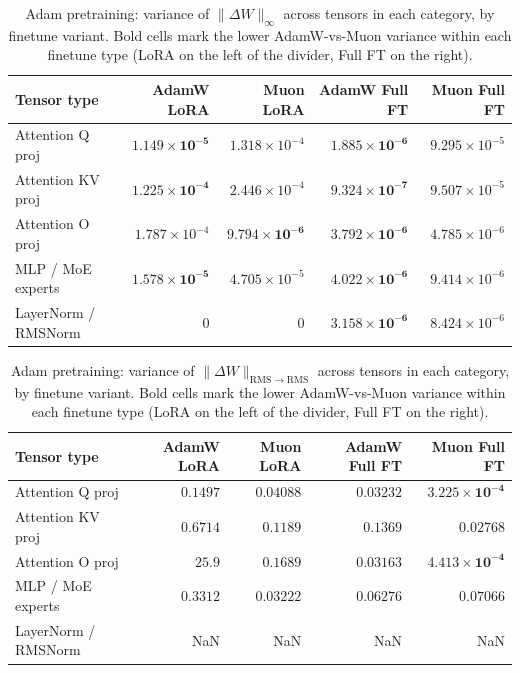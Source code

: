 
\begin{table}[h]
\centering
\begin{tabular}{lrr|rr}
\toprule
Tensor type & AdamW LoRA & Muon LoRA & AdamW Full FT & Muon Full FT \\
\midrule
Attention Q proj & $\mathbf{1.149 \times 10^{-5}}$ & $1.318 \times 10^{-4}$ & $\mathbf{1.885 \times 10^{-6}}$ & $9.295 \times 10^{-5}$ \\
Attention KV proj & $\mathbf{1.225 \times 10^{-4}}$ & $2.446 \times 10^{-4}$ & $\mathbf{9.324 \times 10^{-7}}$ & $9.507 \times 10^{-5}$ \\
Attention O proj & $1.787 \times 10^{-4}$ & $\mathbf{9.794 \times 10^{-6}}$ & $\mathbf{3.792 \times 10^{-6}}$ & $4.785 \times 10^{-6}$ \\
MLP / MoE experts & $\mathbf{1.578 \times 10^{-5}}$ & $4.705 \times 10^{-5}$ & $\mathbf{4.022 \times 10^{-6}}$ & $9.414 \times 10^{-6}$ \\
LayerNorm / RMSNorm & $0$ & $0$ & $\mathbf{3.158 \times 10^{-6}}$ & $8.424 \times 10^{-6}$ \\
\bottomrule
\end{tabular}
\caption{Adam pretraining: variance of $\|\Delta W\|_\infty$ across tensors in each category, by finetune variant. Bold cells mark the lower AdamW-vs-Muon variance within each finetune type (LoRA on the left of the divider, Full FT on the right).}
\label{tab:var-adam-l-inf}
\end{table}

\begin{table}[h]
\centering
\begin{tabular}{lrr|rr}
\toprule
Tensor type & AdamW LoRA & Muon LoRA & AdamW Full FT & Muon Full FT \\
\midrule
Attention Q proj & $0.1497$ & $\mathbf{0.04088}$ & $0.03232$ & $\mathbf{3.225 \times 10^{-4}}$ \\
Attention KV proj & $0.6714$ & $\mathbf{0.1189}$ & $0.1369$ & $\mathbf{0.02768}$ \\
Attention O proj & $25.9$ & $\mathbf{0.1689}$ & $0.03163$ & $\mathbf{4.413 \times 10^{-4}}$ \\
MLP / MoE experts & $0.3312$ & $\mathbf{0.03222}$ & $\mathbf{0.06276}$ & $0.07066$ \\
LayerNorm / RMSNorm & \textrm{NaN} & \textrm{NaN} & \textrm{NaN} & \textrm{NaN} \\
\bottomrule
\end{tabular}
\caption{Adam pretraining: variance of $\|\Delta W\|_{\mathrm{RMS}\rightarrow\mathrm{RMS}}$ across tensors in each category, by finetune variant. Bold cells mark the lower AdamW-vs-Muon variance within each finetune type (LoRA on the left of the divider, Full FT on the right).}
\label{tab:var-adam-rms-rms-induced}
\end{table}

